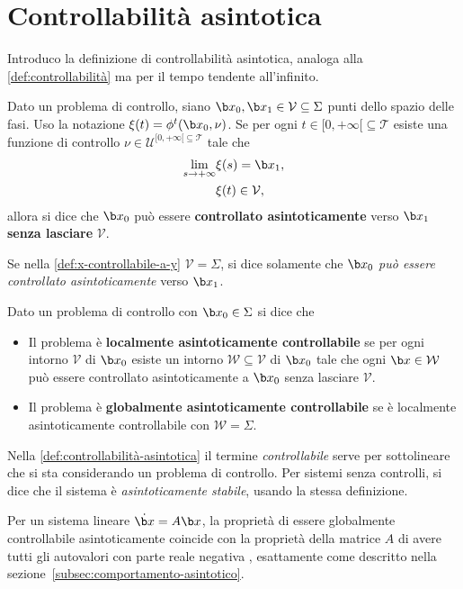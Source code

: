 \section{Controllabilità asintotica}
Introduco la definizione di controllabilità asintotica, analoga alla
\autoref{def:controllabilità} ma per il tempo tendente all'infinito.
\begin{definition}
    Dato un problema di controllo, siano
     $\b x_0, \b x_1 \in \mathcal V \subseteq \Sigma$ punti dello spazio delle fasi.
    Uso la notazione $\xi(t) = \phi^t(\b x_0, \nu)$.
    Se per ogni $t \in[0, +\infty[ \subseteq \mathcal T$
    esiste una funzione di controllo $\nu \in  \mathcal U^{[0, +\infty[ \subseteq \mathcal T}$ tale che
    \begin{align*}
       \lim_{s \to +\infty} &\xi(s) = \b x_1,\\
       &\xi(t) \in \mathcal V,
    \end{align*}
    allora si dice che $\b x_0$ può essere \textbf{controllato asintoticamente} verso
    $\b x_1$ \textbf{senza lasciare} $\mathcal V$.
    \label{def:x-controllabile-a-y}
\end{definition}
Se nella \autoref{def:x-controllabile-a-y} $\mathcal V = \Sigma$,
si dice solamente che
$\b x_0$ \emph{può essere controllato asintoticamente} verso $\b x_1$.
\begin{definition}
    Dato un problema di controllo con $\b x_0 \in \Sigma$ si dice che
    \begin{itemize}
        \item Il problema è \textbf{localmente asintoticamente controllabile}
        se per ogni intorno $\mathcal V$ di $\b x_0$ esiste un intorno
        $\mathcal W \subseteq \mathcal V$ di $\b x_0$ tale che ogni $\b x \in \mathcal W$
        può essere controllato asintoticamente a $\b x_0$ senza lasciare $\mathcal V$.

        \item Il problema è \textbf{globalmente asintoticamente controllabile} se
        è localmente asintoticamente controllabile con $\mathcal W = \Sigma$.
    \end{itemize}
    \label{def:controllabilità-asintotica}
\end{definition}
Nella \autoref{def:controllabilità-asintotica} il termine \emph{controllabile}
serve per sottolineare che si sta considerando un problema di controllo.
Per sistemi senza controlli, si dice che il sistema è \emph{asintoticamente stabile}, usando la
stessa definizione.

Per un sistema lineare $\dot {\b x} = A \b x$, la proprietà di essere globalmente
controllabile asintoticamente coincide con 
la proprietà della matrice $A$ di avere tutti gli autovalori con parte reale negativa \cite{sontagMath}, esattamente
come descritto nella sezione~\ref{subsec:comportamento-asintotico}.